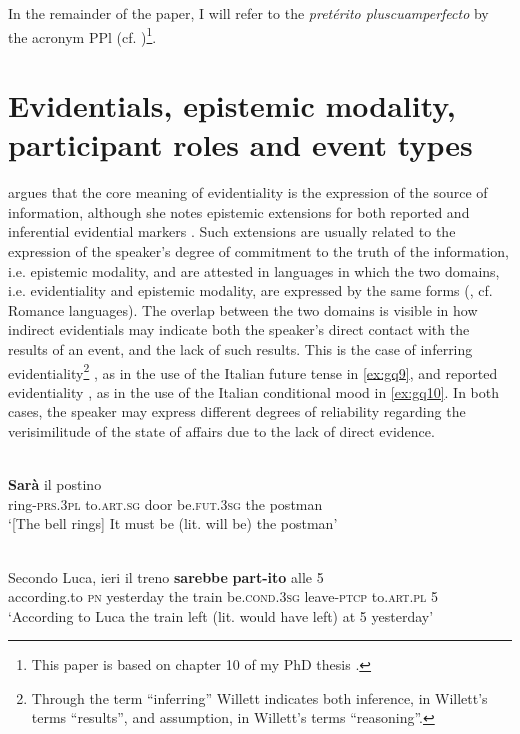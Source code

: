 \documentclass[output=paper]{langsci/langscibook}
\begin{document}
In the remainder of the paper, I will refer to the \textit{pretérito pluscuamperfecto} by the acronym PPl (cf. \citealt{Speranza2014})\footnote{This paper is based on chapter 10 of my PhD thesis \citep{Quartararo2017}.}.


\section{Evidentials, epistemic modality, participant roles and event types}\label{s:gq2}

\citet[3]{Aikhenvald2004} argues that the core meaning of evidentiality is the expression of the source of information, although she notes epistemic extensions for both reported \citep[180]{Aikhenvald2004} and inferential evidential markers \citep[176]{Aikhenvald2004}. Such extensions are usually related to the expression of the speaker’s degree of commitment to the truth of the information, i.e. epistemic modality, and are attested in languages in which the two domains, i.e. evidentiality and epistemic modality, are expressed by the same forms (\citealt[354]{Plungian2001}, cf. Romance languages). The overlap between the two domains is visible in how indirect evidentials may indicate both the speaker’s direct contact with the results of an event, and the lack of such results. This is the case of inferring evidentiality\footnote{Through the term “inferring” Willett indicates both inference, in Willett’s terms “results”, and assumption, in Willett’s terms “reasoning”.} \citep[57]{Willett1988}, as in the use of the Italian future tense in \ref{ex:gq9}, and reported evidentiality \citep[57]{Willett1988}, as in the use of the Italian conditional mood in \ref{ex:gq10}. In both cases, the speaker may express different degrees of reliability regarding the verisimilitude of the state of affairs due to the lack of direct evidence.


\ea \label{ex:gq9}
	\\
	 \textbf{Sarà} il postino\\
	ring-\textsc{prs.3pl} to.\textsc{art.sg} door be.\textsc{fut.3sg} the postman\\
	\glt ‘[The bell rings] It must be (lit. will be) the postman’
\z


\ea \label{ex:gq10}
	\\
	\gll Secondo Luca, ieri il treno \textbf{sarebbe} \textbf{part-ito} alle 5\\
	according.to \textsc{pn} yesterday the train be.\textsc{cond.3sg} leave-\textsc{ptcp} to.\textsc{art.pl} 5\\
	\glt ‘According to Luca the train left (lit. would have left) at 5 yesterday’
\z
\end{document}
